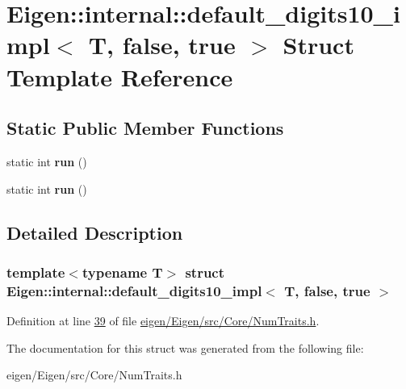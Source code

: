 \hypertarget{struct_eigen_1_1internal_1_1default__digits10__impl_3_01_t_00_01false_00_01true_01_4}{}\section{Eigen\+:\+:internal\+:\+:default\+\_\+digits10\+\_\+impl$<$ T, false, true $>$ Struct Template Reference}
\label{struct_eigen_1_1internal_1_1default__digits10__impl_3_01_t_00_01false_00_01true_01_4}
\subsection*{Static Public Member Functions}
\begin{DoxyCompactItemize}
\item 
\mbox{\label{struct_eigen_1_1internal_1_1default__digits10__impl_3_01_t_00_01false_00_01true_01_4_a6cb192e4c9043235d1d1926cbf94e88a}} 
static int {\bfseries run} ()
\item 
\mbox{\label{struct_eigen_1_1internal_1_1default__digits10__impl_3_01_t_00_01false_00_01true_01_4_a6cb192e4c9043235d1d1926cbf94e88a}} 
static int {\bfseries run} ()
\end{DoxyCompactItemize}


\subsection{Detailed Description}
\subsubsection*{template$<$typename T$>$\newline
struct Eigen\+::internal\+::default\+\_\+digits10\+\_\+impl$<$ T, false, true $>$}



Definition at line \hyperlink{eigen_2_eigen_2src_2_core_2_num_traits_8h_source_l00039}{39} of file \hyperlink{eigen_2_eigen_2src_2_core_2_num_traits_8h_source}{eigen/\+Eigen/src/\+Core/\+Num\+Traits.\+h}.



The documentation for this struct was generated from the following file\+:\begin{DoxyCompactItemize}
\item 
eigen/\+Eigen/src/\+Core/\+Num\+Traits.\+h\end{DoxyCompactItemize}
